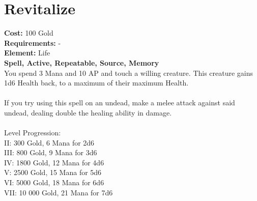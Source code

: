 \section{Revitalize}
\textbf{Cost:} 100 Gold\\
\textbf{Requirements:} -\\
\textbf{Element:} Life\\
\textbf{Spell, Active, Repeatable, Source, Memory}\\
You spend 3 Mana and 10 AP and touch a willing creature. This creature gains 1d6 Health back, to a maximum of their maximum Health.\\
\\
If you try using this spell on an undead, make a melee attack against said undead, dealing double the healing ability in damage.\\
\\
Level Progression:\\
II: 300 Gold, 6 Mana for 2d6\\
III: 800 Gold, 9 Mana for 3d6\\
IV: 1800 Gold, 12 Mana for 4d6\\
V: 2500 Gold, 15 Mana for 5d6\\
VI: 5000 Gold, 18 Mana for 6d6\\
VII: 10 000 Gold, 21 Mana for 7d6\\
